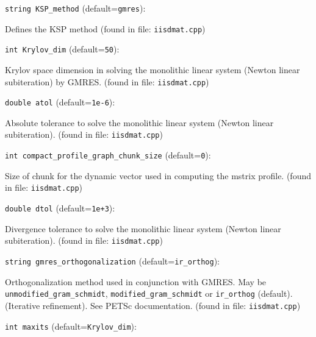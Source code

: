 \item\verb+string KSP_method+ {\rm(default=\verb|gmres|)}:

Defines the KSP method
 (found in file: \verb+iisdmat.cpp+)
\item\verb+int Krylov_dim+ {\rm(default=\verb|50|)}:

Krylov space dimension in solving the monolithic linear
system (Newton linear subiteration) by GMRES.
 (found in file: \verb+iisdmat.cpp+)
\item\verb+double atol+ {\rm(default=\verb|1e-6|)}:

Absolute tolerance to solve the monolithic linear
system (Newton linear subiteration).
 (found in file: \verb+iisdmat.cpp+)
\item\verb+int compact_profile_graph_chunk_size+ {\rm(default=\verb|0|)}:

Size of chunk for the dynamic vector used in computing the
mstrix profile. 
 (found in file: \verb+iisdmat.cpp+)
\item\verb+double dtol+ {\rm(default=\verb|1e+3|)}:

Divergence tolerance to solve the monolithic linear
system (Newton linear subiteration).
 (found in file: \verb+iisdmat.cpp+)
\item\verb+string gmres_orthogonalization+ {\rm(default=\verb|ir_orthog|)}:

Orthogonalization method used in conjunction with GMRES. 
May be  {\tt unmodified\_gram\_schmidt},
\verb+modified_gram_schmidt+ or {\tt ir\_orthog} (default). (Iterative refinement).
See PETSc documentation. 
 (found in file: \verb+iisdmat.cpp+)
\item\verb+int maxits+ {\rm(default=\verb|Krylov_dim|)}:

